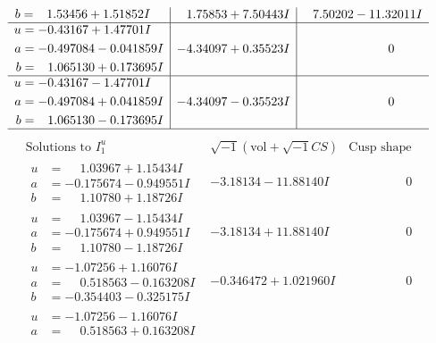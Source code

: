 \documentclass[1p]{elsarticle_modified}
\theoremstyle{definition}
\newcommand{\I}{\sqrt{-1}}
\begin{document}
$$\begin{array}{c|c|c}
\begin{aligned}
b &= \phantom{-}1.53456 + 1.51852 I\end{aligned}
 & \phantom{-}1.75853 + 7.50443 I & \phantom{-}7.50202 - 11.32011 I \\ \hline\begin{aligned}
u &= -0.43167 + 1.47701 I \\
a &= -0.497084 - 0.041859 I \\
b &= \phantom{-}1.065130 + 0.173695 I\end{aligned}
 & -4.34097 + 0.35523 I & \phantom{-0.000000 } 0 \\ \hline\begin{aligned}
u &= -0.43167 - 1.47701 I \\
a &= -0.497084 + 0.041859 I \\
b &= \phantom{-}1.065130 - 0.173695 I\end{aligned}
 & -4.34097 - 0.35523 I & \phantom{-0.000000 } 0\\
 \hline 
 \end{array}$$\newpage$$\begin{array}{c|c|c}  
\text{Solutions to }I^u_{1}& \I (\text{vol} + \sqrt{-1}CS) & \text{Cusp shape}\\
 \hline 
\begin{aligned}
u &= \phantom{-}1.03967 + 1.15434 I \\
a &= -0.175674 - 0.949551 I \\
b &= \phantom{-}1.10780 + 1.18726 I\end{aligned}
 & -3.18134 - 11.88140 I & \phantom{-0.000000 } 0 \\ \hline\begin{aligned}
u &= \phantom{-}1.03967 - 1.15434 I \\
a &= -0.175674 + 0.949551 I \\
b &= \phantom{-}1.10780 - 1.18726 I\end{aligned}
 & -3.18134 + 11.88140 I & \phantom{-0.000000 } 0 \\ \hline\begin{aligned}
u &= -1.07256 + 1.16076 I \\
a &= \phantom{-}0.518563 - 0.163208 I \\
b &= -0.354403 - 0.325175 I\end{aligned}
 & -0.346472 + 1.021960 I & \phantom{-0.000000 } 0 \\ \hline\begin{aligned}
u &= -1.07256 - 1.16076 I \\
a &= \phantom{-}0.518563 + 0.163208 I \\

\end{aligned}
\end{array}$$
\end{document}
